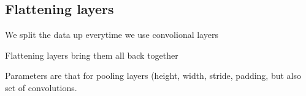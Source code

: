 
\subsection{Flattening layers}

We split the data up everytime we use convolional layers

Flattening layers bring them all back together

Parameters are that for pooling layers (height, width, stride, padding, but also set of convolutions.

